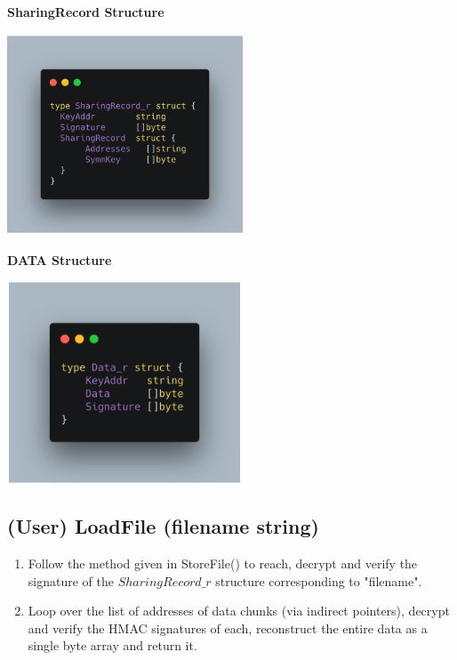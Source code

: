 \documentclass[a4paper, 12pt]{scrartcl}
\begin{document}
\begin{multicols}{2}

\begin{center}
	\textbf{SharingRecord Structure}
\end{center}

\begin{center}
	\includegraphics[width=7cm, height=6cm]{images/sharing.png}
\end{center}

\columnbreak

\begin{center}
	\textbf{DATA Structure}
\end{center}

\begin{center}
	\includegraphics[width=7cm, height=6cm]{images/data.png}
\end{center}

\end{multicols}

\subsection{(User) LoadFile (filename string)}
\begin{enumerate}
	\itemsep0em
	\item Follow the method given in StoreFile() to reach, decrypt and verify the signature of the $SharingRecord\_r$ structure corresponding to "filename".
	\item Loop over the list of addresses of data chunks (via indirect pointers), decrypt and verify the HMAC signatures of each, reconstruct the entire data as a single byte array and return it.

\end{enumerate}
\end{document}
